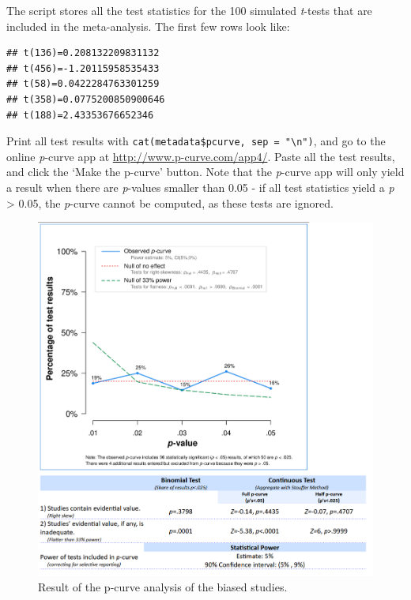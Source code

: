 \documentclass[
  oneside]{book}
\begin{document}
The script stores all the test statistics for the 100 simulated \emph{t}-tests that are included in the meta-analysis. The first few rows look like:

\begin{verbatim}
## t(136)=0.208132209831132
## t(456)=-1.20115958535433
## t(58)=0.0422284763301259
## t(358)=0.0775200850900646
## t(188)=2.43353676652346
\end{verbatim}

Print all test results with \texttt{cat(metadata\$pcurve,\ sep\ =\ "\textbackslash{}n")}, and go to the online \emph{p}-curve app at \url{http://www.p-curve.com/app4/}. Paste all the test results, and click the `Make the p-curve' button. Note that the \emph{p}-curve app will only yield a result when there are \emph{p}-values smaller than 0.05 - if all test statistics yield a \emph{p} \textgreater{} 0.05, the \emph{p}-curve cannot be computed, as these tests are ignored.

\begin{figure}

{\centering \includegraphics[width=1\linewidth]{images/pcurveresult} 

}

\caption{Result of the p-curve analysis of the biased studies.}\label{fig:pcurveresult}
\end{figure}
\end{document}
